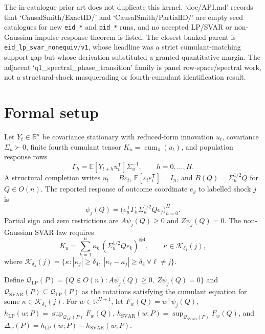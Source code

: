 \documentclass[11pt]{article}
\newcommand{\E}{\mathbb{E}}
\newcommand{\transpose}{\mathsf{T}}
\newcommand{\R}{\mathbb{R}}
\theoremstyle{definition}
\theoremstyle{plain}
\theoremstyle{remark}
\begin{document}
The in-catalogue prior art does not duplicate this kernel.  `doc/API.md' records that `CausalSmith/ExactID/' and `CausalSmith/PartialID/' are empty seed catalogues for new \texttt{eid\_*} and \texttt{pid\_*} runs, and no accepted LP/SVAR or non-Gaussian impulse-response theorem is listed.  The closest banked parent is \texttt{eid\_lp\_svar\_nonequiv}/\texttt{v1}, whose headline was a strict cumulant-matching support gap but whose derivation substituted a granted quantitative margin.  The adjacent `q1_spectral_phase_transition' family is panel row-space/spectral work, not a structural-shock masquerading or fourth-cumulant identification result.

\section{Formal setup}
Let \(Y_t\in\R^n\) be covariance stationary with reduced-form innovation \(u_t\), covariance \(\Sigma_u\succ0\), finite fourth cumulant tensor \(K_u=\operatorname{cum}_4(u_t)\), and population response rows
\[
\Gamma_h=\E[Y_{t+h}u_t^\transpose]\Sigma_u^{-1},\qquad h=0,\ldots,H.
\]
A structural completion writes \(u_t=B\varepsilon_t\), \(\E[\varepsilon_t\varepsilon_t^\transpose]=I_n\), and \(B(Q)=\Sigma_u^{1/2}Q\) for \(Q\in O(n)\).  The reported response of outcome coordinate \(e_y\) to labelled shock \(j\) is
\[
\psi_j(Q)=\bigl(e_y^\transpose\Gamma_h\Sigma_u^{1/2}Qe_j\bigr)_{h=0}^H.
\]
Partial sign and zero restrictions are \(A\psi_j(Q)\ge0\) and \(Z\psi_j(Q)=0\).  The non-Gaussian SVAR law requires
\[
K_u=\sum_{k=1}^n\kappa_k\,(\Sigma_u^{1/2}Qe_k)^{\otimes4},
\qquad \kappa\in\mathcal K_{\delta_4}(j),
\]
where \(\mathcal K_{\delta_4}(j)=\{\kappa:|\kappa_j|\ge\delta_4,\ |\kappa_\ell-\kappa_j|\ge\delta_4\ \forall \ell\ne j\}\).

Define \(\mathcal Q_{\mathrm{LP}}(P)=\{Q\in O(n):A\psi_j(Q)\ge0,\ Z\psi_j(Q)=0\}\) and \(\mathcal Q_{\mathrm{SVAR}}(P)\subseteq\mathcal Q_{\mathrm{LP}}(P)\) as the rotations satisfying the cumulant equation for some \(\kappa\in\mathcal K_{\delta_4}(j)\).  For \(w\in\R^{H+1}\), let \(F_w(Q)=w^\transpose\psi_j(Q)\), \(h_{\mathrm{LP}}(w;P)=\sup_{\mathcal Q_{\mathrm{LP}}(P)}F_w(Q)\), \(h_{\mathrm{SVAR}}(w;P)=\sup_{\mathcal Q_{\mathrm{SVAR}}(P)}F_w(Q)\), and \(\Delta_w(P)=h_{\mathrm{LP}}(w;P)-h_{\mathrm{SVAR}}(w;P)\).
\end{document}
